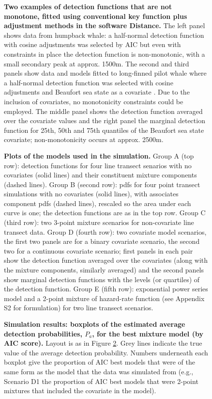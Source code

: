 \documentclass[10pt]{article}
\begin{document}
\begin{figure}[!ht]
\centering
\caption{
{\bf Two examples of detection functions that are not monotone, fitted using conventional key function plus adjustment methods in the software Distance.} The left panel shows data from humpback whale: a half-normal detection function with cosine adjustments was selected by AIC \cite{Williams:2007tc} but even with constraints in place the detection function is non-monotonic, with a small secondary peak at approx. 1500m. The second and third panels show data and models fitted to long-finned pilot whale where a half-normal detection function was selected with cosine adjustments and Beaufort sea state as a covariate \cite{Pike:2003ug}. Due to the inclusion of covariates, no monotonicity constraints could be employed.  The middle panel shows the detection function averaged over the covariate values and the right panel the marginal detection function for 25th, 50th and 75th quantiles of the Beaufort sea state covariate; non-monotonicity occurs at approx. 2500m.
}
\label{fig1}
\end{figure}


\begin{figure}[!ht]
\centering
\caption{
{\bf Plots of the models used in the simulation.} Group A (top row): detection functions for four line transect senarios with no covariates (solid lines) and their constituent mixture components (dashed lines). Group B (second row): pdfs for four point transect simulations with no covariates (solid lines), with associates component pdfs (dashed lines), rescaled so the area under each curve is one; the detection functions are as in the top row. Group C (third row): two 3-point mixture scenarios for non-covariate line transect data. Group D (fourth row): two covariate model scenarios, the first two panels are for a binary covariate scenario, the second two for a continuous covariate scenario; first panels in each pair show the detection function averaged over the covariates (along with the mixture components, similarly averaged) and the second panels show marginal detection functions with the levels (or quartiles) of the detection function.  Group E (fifth row): exponential power series model and a 2-point mixture of hazard-rate function (see Appendix S2 for formulation) for two line transect scenarios.
}
\label{sim-detfcts}
\end{figure}

\begin{figure}[!ht]
\centering
\caption{
{\bf Simulation results: boxplots of the estimated average detection probabilities, $P_a$, for the best mixture model (by AIC score).} Layout is as in Figure \ref{sim-detfcts}. Grey lines indicate the true value of the average detection probability. Numbers underneath each boxplot give the proportion of AIC best models that were of the same form as the model that the data was simulated from (e.g., Scenario D1 the proportion of AIC best models that were 2-point mixtures that included the covariate in the model).
}
\label{sim-boxplots}
\end{figure}
\end{document}
